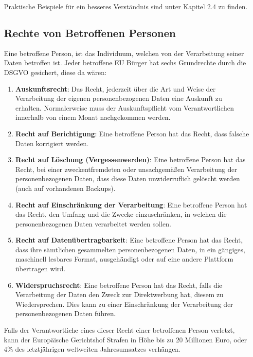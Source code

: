 Praktische Beispiele für ein besseres Verständnis sind unter Kapitel 2.4 zu finden.

\subsection{Rechte von Betroffenen Personen}
Eine betroffene Person, ist das Individuum, welchen von der Verarbeitung seiner Daten betroffen ist.
Jeder betroffene EU Bürger hat sechs Grundrechte durch die DSGVO gesichert, diese da wären:

\begin{enumerate}
    \item \textbf{Auskunftsrecht}: Das Recht, jederzeit über die Art und Weise der Verarbeitung der eigenen personenbezogenen Daten eine Auskunft zu erhalten. Normalerweise muss der Auskunftspflicht vom Verantwortlichen innerhalb von einem Monat nachgekommen werden.
    \item \textbf{Recht auf Berichtigung}: Eine betroffene Person hat das Recht, dass falsche Daten korrigiert werden.
    \item \textbf{Recht auf Löschung (Vergessenwerden)}: Eine betroffene Person hat das Recht, bei einer zweckentfremdeten oder unsachgemäßen Verarbeitung der personenbezogenen Daten, dass diese Daten unwiderruflich gelöscht werden (auch auf vorhandenen Backups).
    \item \textbf{Recht auf Einschränkung der Verarbeitung}: Eine betroffene Person hat das Recht, den Umfang und die Zwecke einzuschränken, in welchen die personenbezogenen Daten verarbeitet werden sollen.
    \item \textbf{Recht auf Datenübertragbarkeit}: Eine betroffene Person hat das Recht, dass ihre sämtlichen gesammelten personenbezogenen Daten, in ein gängiges, maschinell lesbares Format, ausgehändigt oder auf eine andere Plattform übertragen wird.
    \item \textbf{Widerspruchsrecht}: Eine betroffene Person hat das Recht, falls die Verarbeitung der Daten den Zweck zur Direktwerbung hat, diesem zu Wiedersprechen. Dies kann zu einer Einschränkung der Verarbeitung der personenbezogenen Daten führen.
\end{enumerate}
    
Falls der Verantwortliche eines dieser Recht einer betroffenen Person verletzt, kann der Europäische Gerichtshof Strafen in Höhe bis zu 20 Millionen Euro, oder 4\% des letztjährigen weltweiten Jahresumsatzes verhängen.

